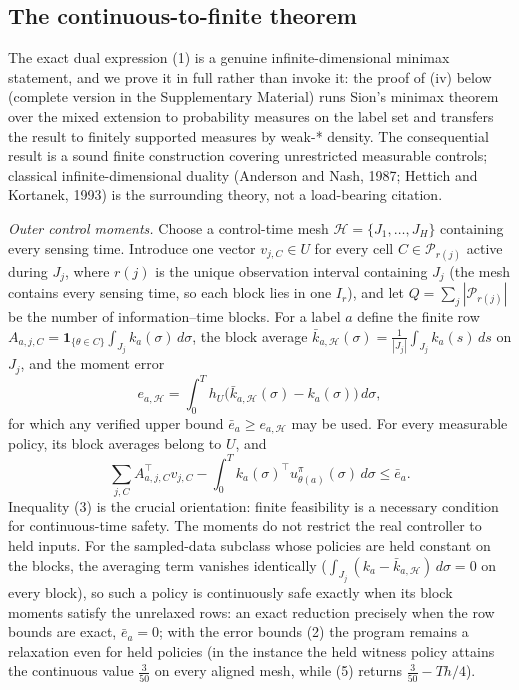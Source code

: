 \documentclass[10pt,twocolumn]{article}
\theoremstyle{plain}
\theoremstyle{definition}
\theoremstyle{remark}
\begin{document}
\subsection{The continuous-to-finite theorem}\label{lp-bridge}

The exact dual expression (1) is a genuine infinite-dimensional minimax
statement, and we prove it in full rather than invoke it: the proof of
(iv) below (complete version in the Supplementary Material) runs Sion's
minimax theorem over the mixed extension to probability measures on the
label set and transfers the result to finitely supported measures by
weak-* density. The consequential result is a sound finite construction
covering unrestricted measurable controls; classical infinite-dimensional
duality (Anderson and Nash, 1987; Hettich and Kortanek, 1993) is the
surrounding theory, not a load-bearing citation.

\emph{Outer control moments.} Choose a control-time mesh
\(\mathcal{H} = \{J_1,\dots,J_H\}\) containing every sensing time. Introduce
one vector \(v_{j,C} \in U\) for every cell \(C \in \mathcal{P}_{r(j)}\)
active during \(J_j\), where \(r(j)\) is the unique observation interval
containing \(J_j\) (the mesh contains every sensing time, so each block
lies in one \(I_r\)), and let \(Q = \sum_j |\mathcal{P}_{r(j)}|\) be the
number of information--time blocks. For a label \(a\) define the finite row
\(A_{a,j,C} = \mathbf{1}_{\{\theta \in C\}} \int_{J_j} k_a(\sigma)\, d\sigma\),
the block average
\(\bar{k}_{a,\mathcal{H}}(\sigma) = \frac{1}{|J_j|} \int_{J_j} k_a(s)\, ds\)
on \(J_j\), and the moment error
\[
e_{a,\mathcal{H}} = \int_0^T h_U\!\bigl(\bar{k}_{a,\mathcal{H}}(\sigma)
- k_a(\sigma)\bigr)\, d\sigma,
\tag{2}
\]
for which any verified upper bound \(\bar{e}_a \ge e_{a,\mathcal{H}}\) may be
used. For every measurable policy, its block averages belong to \(U\), and
\[
\sum_{j,C} A_{a,j,C}^\top v_{j,C} - \int_0^T k_a(\sigma)^\top
u^\pi_{\theta(a)}(\sigma)\, d\sigma \le \bar{e}_a.
\tag{3}
\]
Inequality (3) is the crucial orientation: finite feasibility is a
necessary condition for continuous-time safety. The moments do not restrict
the real controller to held inputs. For the sampled-data subclass whose policies are
held constant on the blocks, the averaging term vanishes identically
(\(\int_{J_j}(k_a - \bar{k}_{a,\mathcal{H}})\, d\sigma = 0\) on every
block), so such a policy is continuously safe exactly when its block
moments satisfy the unrelaxed rows: an exact reduction precisely when the
row bounds are exact, \(\bar{e}_a = 0\); with the error bounds (2) the
program remains a relaxation even for held policies (in the instance the
held witness policy attains the continuous value \(\tfrac3{50}\) on every
aligned mesh, while (5) returns \(\tfrac3{50} - Th/4\)).
\end{document}
